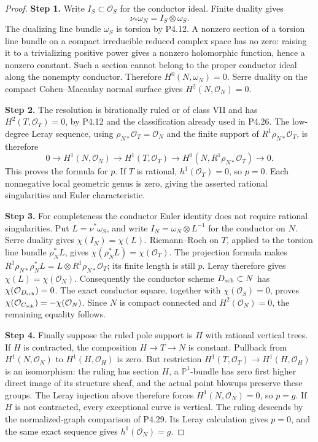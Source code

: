 \begin{proof}
\noindent\textbf{Step 1.} Write $I_S\subset\mathcal O_S$ for the conductor ideal.
Finite duality gives
\[
 \nu_*\omega_N=I_S\otimes\omega_S.
\]
The dualizing line bundle $\omega_S$ is torsion by P4.12.
A nonzero section of a torsion line bundle on a compact
irreducible reduced complex space has no zero: raising it
to a trivializing positive power gives a nonzero holomorphic
function, hence a nonzero constant. Such a section cannot
belong to the proper conductor ideal along the nonempty
conductor. Therefore $H^0(N,\omega_N)=0$. Serre duality
on the compact Cohen--Macaulay normal surface gives
$H^2(N,\mathcal O_N)=0$.

\noindent\textbf{Step 2.} The resolution is birationally ruled or of class VII and
has $H^2(T,\mathcal O_T)=0$, by P4.12 and the classification
already used in P4.26. The low-degree Leray sequence,
using $\rho_{N*}\mathcal O_T=\mathcal O_N$ and the
finite support of $R^1\rho_{N*}\mathcal O_T$, is therefore
\[
 0\longrightarrow H^1(N,\mathcal O_N)
 \longrightarrow H^1(T,\mathcal O_T)
 \longrightarrow H^0(N,R^1\rho_{N*}\mathcal O_T)
 \longrightarrow0.
\]
This proves the formula for $p$. If $T$ is rational,
$h^1(\mathcal O_T)=0$, so $p=0$. Each nonnegative local
geometric genus is zero, giving the asserted rational
singularities and Euler characteristic.

\noindent\textbf{Step 3.} For completeness the conductor Euler identity does not
require rational singularities. Put $L=\nu^*\omega_S$,
and write $I_N=\omega_N\otimes L^{-1}$ for the conductor
on $N$. Serre duality gives $\chi(I_N)=\chi(L)$.
Riemann--Roch on $T$, applied to the torsion line bundle
$\rho_N^*L$, gives
$\chi(\rho_N^*L)=\chi(\mathcal O_T)$.
The projection formula makes
$R^1\rho_{N*}\rho_N^*L=L\otimes R^1\rho_{N*}\mathcal O_T$;
its finite length is still $p$. Leray therefore gives
$\chi(L)=\chi(\mathcal O_N)$.
Consequently the conductor scheme $D_{\rm sch}\subset N$
has $\chi(\mathcal O_{D_{\rm sch}})=0$.
The exact conductor square, together with
$\chi(\mathcal O_S)=0$, proves
$\chi(\mathcal O_{C_{\rm sch}})=-\chi(\mathcal O_N)$.
Since $N$ is compact connected and $H^2(\mathcal O_N)=0$,
the remaining equality follows.

\noindent\textbf{Step 4.} Finally suppose the ruled pole support is $H$ with
rational vertical trees. If $H$ is contracted, the
composition $H\to T\to N$ is constant. Pullback from
$H^1(N,\mathcal O_N)$ to $H^1(H,\mathcal O_H)$ is zero.
But restriction
$H^1(T,\mathcal O_T)\to H^1(H,\mathcal O_H)$ is an
isomorphism: the ruling has section $H$, a
$\mathbb P^1$-bundle has zero first higher direct image
of its structure sheaf, and the actual point blowups
preserve these groups. The Leray injection above
therefore forces $H^1(N,\mathcal O_N)=0$, so $p=g$.
If $H$ is not contracted, every exceptional curve is
vertical. The ruling descends by the normalized-graph
comparison of P4.29. Its Leray calculation gives $p=0$,
and the same exact sequence gives $h^1(\mathcal O_N)=g$.
\end{proof}



